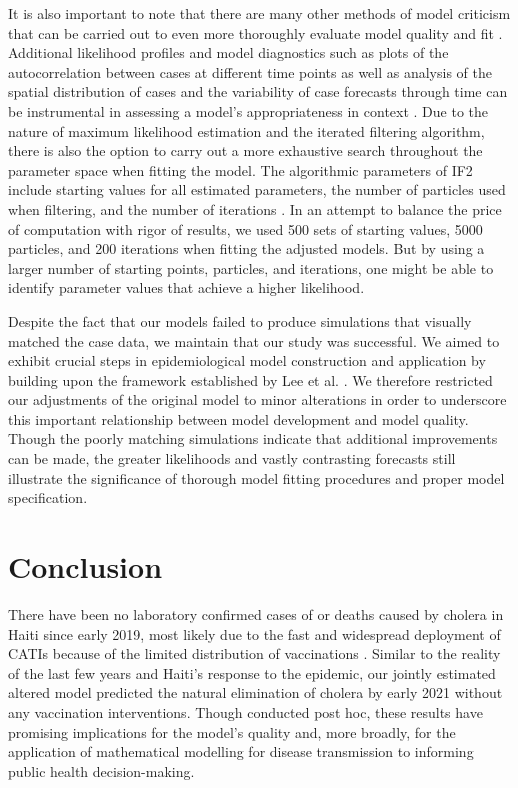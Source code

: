 \documentclass[12pt]{article}
\begin{document}
   It is also important to note that there are many other methods of model criticism that can be carried out to even more thoroughly evaluate model quality and fit \cite{Millar, Cole}. Additional likelihood profiles and model diagnostics such as plots of the autocorrelation between cases at different time points as well as analysis of the spatial distribution of cases and the variability of case forecasts through time can be instrumental in assessing a model's appropriateness in context \cite{King_av}. Due to the nature of maximum likelihood estimation and the iterated filtering algorithm, there is also the option to carry out a more exhaustive search throughout the parameter space when fitting the model. The algorithmic parameters of IF2 include starting values for all estimated parameters, the number of particles used when filtering, and the number of iterations \cite{Ionides_infpomp}. In an attempt to balance the price of computation with rigor of results, we used 500 sets of starting values, 5000 particles, and 200 iterations when fitting the adjusted models. But by using a larger number of starting points, particles, and iterations, one might be able to identify parameter values that achieve a higher likelihood. 
   
   Despite the fact that our models failed to produce simulations that visually matched the case data, we maintain that our study was successful. We aimed to exhibit crucial steps in epidemiological model construction and application by building upon the framework established by Lee et al. \cite{Lee_haiticholera}. We therefore restricted our adjustments of the original model to minor alterations in order to underscore this important relationship between model development and model quality. Though the poorly matching simulations indicate that additional improvements can be made, the greater likelihoods and vastly contrasting forecasts still illustrate the significance of thorough model fitting procedures and proper model specification.

\section{Conclusion}

 There have been no laboratory confirmed cases of or deaths caused by cholera in Haiti since early 2019, most likely due to the fast and widespread deployment of CATIs because of the limited distribution of vaccinations \cite{Rebaudet}. Similar to the reality of the last few years and Haiti's response to the epidemic, our jointly estimated altered model predicted the natural elimination of cholera by early 2021 without any vaccination interventions. Though conducted post hoc, these results have promising implications for the model's quality and, more broadly, for the application of mathematical modelling for disease transmission to informing public health decision-making.
\end{document}

